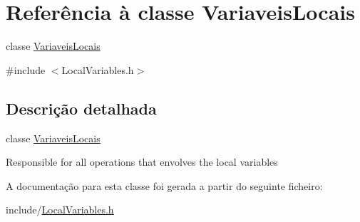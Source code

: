 \hypertarget{classVariaveisLocais}{}\section{Referência à classe Variaveis\+Locais}
\label{classVariaveisLocais}


classe \hyperlink{classVariaveisLocais}{Variaveis\+Locais}  




{\ttfamily \#include $<$Local\+Variables.\+h$>$}



\subsection{Descrição detalhada}
classe \hyperlink{classVariaveisLocais}{Variaveis\+Locais} 

Responsible for all operations that envolves the local variables 

A documentação para esta classe foi gerada a partir do seguinte ficheiro\+:\begin{DoxyCompactItemize}
\item 
include/\hyperlink{LocalVariables_8h}{Local\+Variables.\+h}\end{DoxyCompactItemize}
